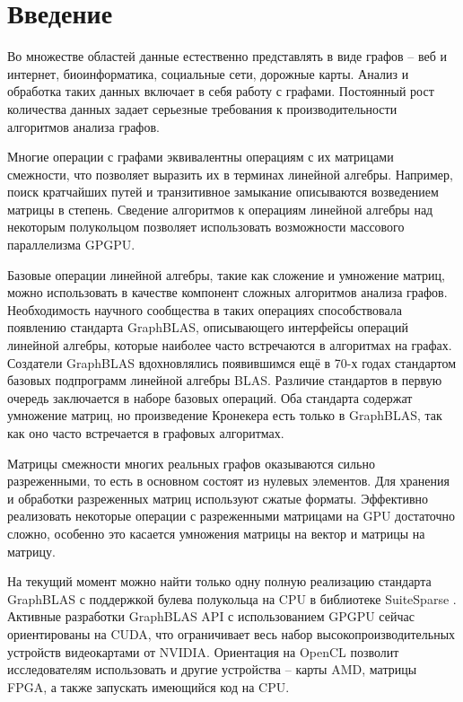 \documentclass[14pt]{extarticle}
\begin{document}
\sloppy

\tableofcontents
	 
\section*{Введение}
\label{sec:intro}
	 Во множестве областей данные естественно представлять в виде графов -- веб и интернет, биоинформатика, социальные сети, дорожные карты. Анализ и обработка таких данных включает в себя работу с графами. Постоянный рост количества данных задает серьезные требования к производительности алгоритмов анализа графов. 
	 
	 Многие операции с графами эквивалентны операциям с их матрицами смежности, что позволяет выразить их в терминах линейной алгебры. Например, поиск кратчайших путей и транзитивное замыкание описываются возведением матрицы в степень. Сведение алгоритмов к операциям линейной алгебры над некоторым полукольцом позволяет использовать возможности массового параллелизма GPGPU.
	 
	 Базовые операции линейной алгебры, такие как сложение и умножение матриц, можно использовать в качестве компонент сложных алгоритмов анализа графов. Необходимость научного сообщества в таких операциях способствовала появлению стандарта GraphBLAS\cite{graphblas}, описывающего интерфейсы операций линейной алгебры, которые наиболее часто встречаются в алгоритмах на графах. Создатели GraphBLAS вдохновлялись появившимся ещё в 70-х годах стандартом базовых подпрограмм линейной алгебры BLAS. Различие стандартов в первую очередь заключается в наборе базовых операций. Оба стандарта содержат умножение матриц, но произведение Кронекера есть только в GraphBLAS, так как оно часто встречается в графовых алгоритмах.
	 
	 Матрицы смежности многих реальных графов оказываются сильно разреженными, то есть в основном состоят из нулевых элементов. Для хранения и обработки разреженных матриц используют сжатые форматы. Эффективно реализовать некоторые операции с разреженными матрицами на GPU достаточно сложно, особенно это касается умножения матрицы на вектор и матрицы на матрицу. 
	 
	 На текущий момент можно найти только одну полную реализацию стандарта GraphBLAS с поддержкой булева полукольца на CPU в библиотеке SuiteSparse \cite{suite_sparse}. Активные разработки GraphBLAS API с использованием GPGPU сейчас ориентированы на CUDA, что ограничивает весь набор высокопроизводительных устройств видеокартами от NVIDIA. Ориентация на OpenCL позволит исследователям использовать и другие устройства -- карты AMD, матрицы FPGA, а также запускать имеющийся код на CPU.  
	  
\end{document}
